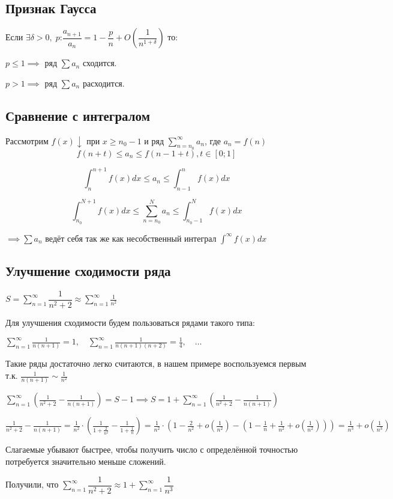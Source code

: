 \subsection{Признак Гаусса}

Если $\exists \delta > 0,\; p$:$ \dfrac{a_{n+1}}{a_n} = 1 - \dfrac{p}{n} + O\left(\dfrac{1}{n^{1 + \delta}}\right) $
то:

$p \leq 1 \implies$ ряд $\sum a_n$ сходится.

$p > 1 \implies$ ряд $\sum a_n$ расходится.

\subsection{Сравнение с интегралом}

Рассмотрим $f(x) \downarrow$ при $x \geq n_0 - 1$ и ряд $\sum_{n=n_0}^{\infty} a_n$, где $a_n = f(n)$ 
$$f(n + t) \leq a_n \leq f(n - 1 + t), t \in [0; 1]$$

$$\int_{n}^{n+1} f(x)dx \leq a_n \leq \int_{n-1}^{n} f(x)dx$$

$$\int_{n_0}^{N+1} f(x)dx \leq \sum_{n=n_0}^{N} a_n \leq \int_{n_0-1}^{N} f(x)dx$$

$\implies \sum a_n$ ведёт себя так же как несобственный интеграл $\int^{\infty}f(x)dx$

\subsection{Улучшение сходимости ряда}

\example $S = \sum_{n=1}^{\infty} \dfrac{1}{n^2 + 2} \approx \sum_{n=1}^{\infty} \frac{1}{n^2}$

Для улучшения сходимости будем пользоваться рядами такого типа:

$\sum_{n=1}^{\infty} \frac{1}{n(n+1)} = 1,\quad \sum_{n=1}^{\infty} \frac{1}{n(n+1)(n+2)} = \frac{1}{4},\quad \dots$

Такие ряды достаточно легко считаются, в нашем примере воспользуемся первым т.к. $\frac{1}{n(n+1)} \sim \frac{1}{n^2}$

$\sum_{n=1}^{\infty} \left(\frac{1}{n^2+2} - \frac{1}{n(n+1)}\right) = S - 1 \implies S = 1 + \sum_{n=1}^{\infty} \left(\frac{1}{n^2 + 2} - \frac{1}{n(n+1)}\right)$

$\frac{1}{n^2+2} - \frac{1}{n(n+1)} = \frac{1}{n^2} \cdot \left(\frac{1}{1 + \frac{2}{n^2}} - \frac{1}{1 + \frac{1}{n}}\right) = \frac{1}{n^2} \cdot \left(1 - \frac{2}{n^2} + o\left(\frac{1}{n^2}\right) - \left(1 - \frac{1}{n} + \frac{1}{n^2} + o\left(\frac{1}{n^2}\right)\right)\right) = \frac{1}{n^3} + o\left(\frac{1}{n^3}\right)$

Слагаемые убывают быстрее, чтобы получить число с определённой точностью потребуется значительно меньше сложений.

Получили, что $\sum_{n=1}^{\infty} \dfrac{1}{n^2 + 2} \approx 1 + \sum_{n=1}^{\infty} \dfrac{1}{n^3}$


